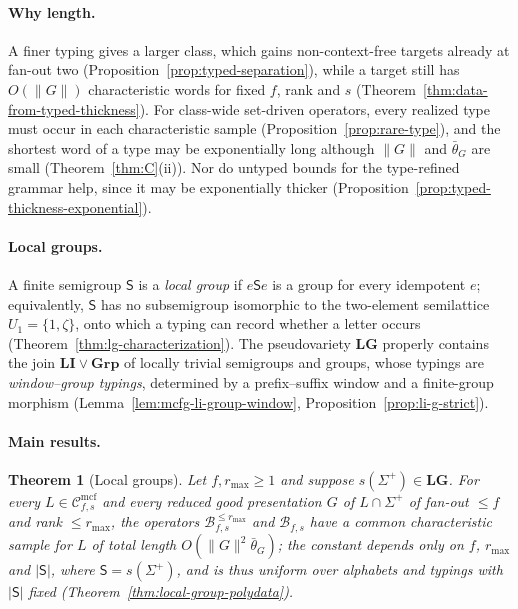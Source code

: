 \documentclass[11pt]{article}
\numberwithin{equation}{section}
\theoremstyle{plain}
\theoremstyle{definition}
\theoremstyle{remark}
\newcommand{\Cmcf}[2]{\mathcal{C}^{\mathrm{mcf}}_{#1,#2}}
\theoremstyle{plain}
\newtheorem{mainthm}{Theorem}
\begin{document}
\paragraph{Why length.}
A finer typing gives a larger class, which gains non-context-free targets
already at fan-out two (Proposition~\ref{prop:typed-separation}), while a
target still has
$O(\|G\|)$ characteristic words for fixed $f$, rank and $s$
(Theorem~\ref{thm:data-from-typed-thickness}).  For class-wide set-driven operators, every realized type must occur in
each characteristic sample (Proposition~\ref{prop:rare-type}), and
the shortest word of a type may be exponentially long although $\|G\|$ and
$\bar\theta_G$ are small (Theorem~\ref{thm:C}(ii)).  Nor do untyped bounds for the
type-refined grammar help, since it may be exponentially thicker
(Proposition~\ref{prop:typed-thickness-exponential}).

\paragraph{Local groups.}
A finite semigroup $\mathsf S$ is a \emph{local group} if $e\mathsf Se$ is a
group for every idempotent $e$; equivalently, $\mathsf S$ has no subsemigroup
isomorphic to the two-element semilattice $U_1=\{1,\zeta\}$, onto which a
typing can record whether a letter occurs
(Theorem~\ref{thm:lg-characterization}).  The pseudovariety $\mathbf{LG}$
properly contains the join $\mathbf{LI}\vee\mathbf{Grp}$ of locally trivial
semigroups and groups, whose typings are
\emph{window--group typings}, determined by a prefix--suffix window and a
finite-group morphism (Lemma~\ref{lem:mcfg-li-group-window},
Proposition~\ref{prop:li-g-strict}).

\paragraph{Main results.}

\begin{mainthm}[Local groups]
\label{thm:A}
Let $f,r_{\max}\ge1$ and suppose $s(\Sigma^+)\in\mathbf{LG}$.  For every
$L\in\Cmcf{f}{s}$ and every reduced good presentation $G$ of $L\cap\Sigma^+$ of
fan-out $\le f$ and rank $\le r_{\max}$, the operators
$\mathcal B^{\le r_{\max}}_{f,s}$ and $\mathcal B_{f,s}$ have a common
characteristic sample for $L$ of total length $O(\|G\|^2\bar\theta_G)$; the
constant depends only on $f$, $r_{\max}$ and $|\mathsf S|$, where
$\mathsf S=s(\Sigma^+)$, and is thus uniform over alphabets and typings with
$|\mathsf S|$ fixed \textup(Theorem~\ref{thm:local-group-polydata}\textup).
\end{mainthm}
\end{document}

